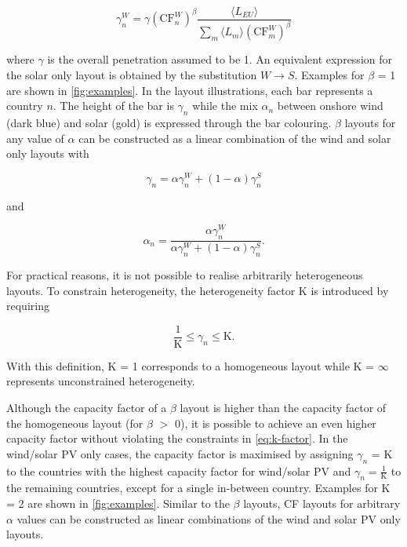 \documentclass[a4paper, 5p, sort&compress]{elsarticle}%
\newcommand{\paren}[1]{\left(#1\right)}
\begin{document}
\begin{equation}
  \label{eq:8}
  \gamma_{n}^{W} = \gamma \paren{\text{CF}^{W}_{n}}^{\beta} \frac{\langle L_{EU}
    \rangle}{\sum_{m} \langle L_{m}
    \rangle \paren{\text{CF}^{W}_{m}}^{\beta}}
\end{equation}

where $\gamma$ is the overall penetration assumed to be 1. An equivalent
expression for the solar only layout is obtained by the substitution
$W \to S$. Examples for $\beta$ = 1 are shown in \cref{fig:examples}. In
the layout illustrations, each bar represents a country $n$. The
height of the bar is $\gamma_{n}$ while the mix $\alpha_{n}$ between onshore
wind (dark blue) and solar (gold) is expressed through the bar
colouring. $\beta$ layouts for any value of $\alpha$ can be constructed as a
linear combination of the wind and solar only layouts with


\begin{equation}
  \label{eq:9}
  \gamma_{n} = \alpha \gamma^{W}_{n} + (1-\alpha) \gamma^{S}_{n} 
\end{equation}

and

\begin{equation}
  \label{eq:9}
  \alpha_{n} = \frac{\alpha \gamma_{n}^{W}}{\alpha \gamma_{n}^{W} + (1-\alpha) \gamma_{n}^{S}} .
\end{equation}


For practical reasons, it is not possible to realise arbitrarily
heterogeneous layouts. To constrain heterogeneity, the heterogeneity
factor K is introduced by requiring

\begin{equation}
  \label{eq:k-factor}
  \frac{1}{\text{K}} \leq \gamma_{n} \leq \text{K} .
\end{equation}

With this definition, K = 1 corresponds to a homogeneous layout while
K = $\infty$ represents unconstrained heterogeneity.

Although the capacity factor of a $\beta$ layout is higher than the
capacity factor of the homogeneous layout (for $\beta$ $>$ 0), it is
possible to achieve an even higher capacity factor without violating
the constraints in \cref{eq:k-factor}. In the wind/solar PV only
cases, the capacity factor is maximised by assigning $\gamma_{n}$ = K to
the countries with the highest capacity factor for wind/solar PV and
$\gamma_{n} = \frac{1}{\text{K}}$ to the remaining countries, except for a
single in-between country. Examples for K = 2 are shown in
\cref{fig:examples}. Similar to the $\beta$ layouts, CF layouts for
arbitrary $\alpha$ values can be constructed as linear combinations of the
wind and solar PV only layouts.
\end{document}

